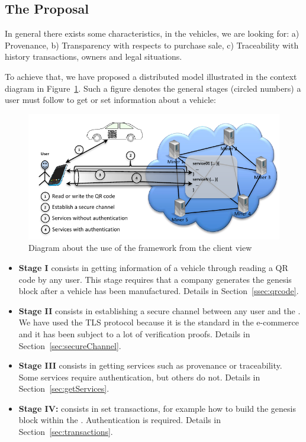 \subsection{The Proposal}
\label{subsec:proposal}
In general there exists some characteristics, in the vehicles, we are looking for:
a) Provenance,
b) Transparency with respects to purchase sale,
c) Traceability with history transactions, owners and legal situations.

To achieve that, we have proposed a distributed model illustrated in the context
diagram in Figure~\ref{fig:flowChartFramework}. Such a figure denotes
the general stages (circled numbers) a user must follow to get or set information about a 
vehicle:
\begin{figure}[bt]
  \centering
    \includegraphics[scale=0.75]{images/gralScheme.pdf}
        \caption{Diagram about the use of the framework from the client view}
    \label{fig:flowChartFramework}
\end{figure}

\begin{itemize}
  \item \textbf{Stage I} consists in getting information of a vehicle through reading
    a QR code by any user.
    This stage requires that a company generates the genesis block after a vehicle has 
    been manufactured. Details in Section~\ref{ssec:qrcode}.
  \item \textbf{Stage II} consists in establishing a secure channel between any user
    and the \blockchaincarnetwork. We
    have used the TLS protocol because it is the standard in the
    e-commerce and it has been subject to a lot of verification proofs.
    Details in Section~\ref{sec:secureChannel}.
  \item \textbf{Stage III} consists in getting services such as provenance or 
    traceability. Some services require authentication, but others do not.
    Details in Section~\ref{sec:getServices}.  
  \item \textbf{Stage IV:} consists in set transactions, for example how to build
    the genesis block within the  \blockchaincarnetwork. Authentication is required. 
    Details in Section~\ref{sec:transactions}. 
\end{itemize}


